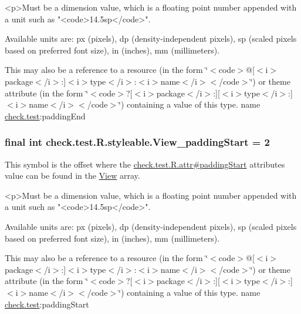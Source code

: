 \begin{DoxyVerb}      <p>Must be a dimension value, which is a floating point number appended with a unit such as "<code>14.5sp</code>".
\end{DoxyVerb}
 Available units are\+: px (pixels), dp (density-\/independent pixels), sp (scaled pixels based on preferred font size), in (inches), mm (millimeters). 

This may also be a reference to a resource (in the form \char`\"{}$<$code$>$@\mbox{[}$<$i$>$package$<$/i$>$\+:\mbox{]}$<$i$>$type$<$/i$>$\+:$<$i$>$name$<$/i$>$$<$/code$>$\char`\"{}) or theme attribute (in the form \char`\"{}$<$code$>$?\mbox{[}$<$i$>$package$<$/i$>$\+:\mbox{]}\mbox{[}$<$i$>$type$<$/i$>$\+:\mbox{]}$<$i$>$name$<$/i$>$$<$/code$>$\char`\"{}) containing a value of this type.  name \hyperlink{namespacecheck_1_1test}{check.\+test}\+:padding\+End \hypertarget{classcheck_1_1test_1_1_r_1_1styleable_a802b6e1c0429edd87c36d355b095d838}{}
\subsubsection[{View\+\_\+padding\+Start}]{\setlength{\rightskip}{0pt plus 5cm}final int check.\+test.\+R.\+styleable.\+View\+\_\+padding\+Start = 2\hspace{0.3cm}{\ttfamily [static]}}\label{classcheck_1_1test_1_1_r_1_1styleable_a802b6e1c0429edd87c36d355b095d838}
This symbol is the offset where the \hyperlink{classcheck_1_1test_1_1_r_1_1attr_a1e5a8103a877312cb676b708423cc823}{check.\+test.\+R.\+attr\#padding\+Start} attribute\textquotesingle{}s value can be found in the \hyperlink{classcheck_1_1test_1_1_r_1_1styleable_a649d1cf46b1780fca1185680fabbb1e1}{View} array.

\begin{DoxyVerb}      <p>Must be a dimension value, which is a floating point number appended with a unit such as "<code>14.5sp</code>".
\end{DoxyVerb}
 Available units are\+: px (pixels), dp (density-\/independent pixels), sp (scaled pixels based on preferred font size), in (inches), mm (millimeters). 

This may also be a reference to a resource (in the form \char`\"{}$<$code$>$@\mbox{[}$<$i$>$package$<$/i$>$\+:\mbox{]}$<$i$>$type$<$/i$>$\+:$<$i$>$name$<$/i$>$$<$/code$>$\char`\"{}) or theme attribute (in the form \char`\"{}$<$code$>$?\mbox{[}$<$i$>$package$<$/i$>$\+:\mbox{]}\mbox{[}$<$i$>$type$<$/i$>$\+:\mbox{]}$<$i$>$name$<$/i$>$$<$/code$>$\char`\"{}) containing a value of this type.  name \hyperlink{namespacecheck_1_1test}{check.\+test}\+:padding\+Start \hypertarget{classcheck_1_1test_1_1_r_1_1styleable_a2c622119b55ec8f1cab226d62d3022bf}{}
